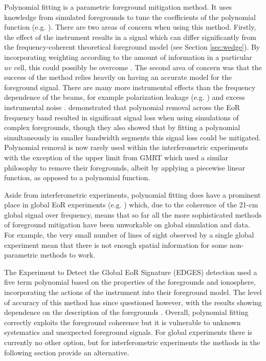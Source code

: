 Polynomial fitting is a parametric foreground mitigation method. It uses knowledge from simulated foregrounds to tune the coefficients of the polynomial function (e.g. \cite{jelic08}). There are two areas of concern when using this method. Firstly, the effect of the instrument results in a signal which can differ significantly from the frequency-coherent theoretical foreground model (see Section \ref{sec:wedge}). By incorporating weighting according to the amount of information in a particular $uv$ cell, this could possibly be overcome \cite{Liu2009MNRAS.398..401L,Bowman2009ApJ...695..183B}. The second area of concern was that the success of the method relies heavily on having an accurate model for the foreground signal. There are many more instrumental effects than the frequency dependence of the beams, for example polarization leakage (e.g. \cite{Nunhokee2017ApJ...848...47N,Asad2015MNRAS.451.3709A}) and excess instrumental noise \cite{Patil2016MNRAS.463.4317P}. \cite{Wang2013ApJ...763...90W} demonstrated that polynomial removal across the EoR frequency band resulted in significant signal loss when using simulations of complex foregrounds, though they also showed that by fitting a polynomial simultaneously in smaller bandwidth segments this signal loss could be mitigated. Polynomial removal is now rarely used within the interferometric experiments with the exception of the upper limit from GMRT \cite{Paciga2011MNRAS.413.1174P} which used a similar philosophy to remove their foregrounds, albeit by applying a piecewise linear function, as opposed to a polynomial function. 

Aside from interferometric experiments, polynomial fitting does have a prominent place in global EoR experiments (e.g. \cite{Singh2018ApJ...858...54S,Bowman2018Natur.555...67B}) which, due to the coherence of the 21-cm global signal over frequency, means that so far all the more sophisticated methods of foreground mitigation have been unworkable on global simulation and data. For example, the very small number of lines of sight observed by a single global experiment mean that there is not enough spatial information for some non-parametric methods to work.

The Experiment to Detect the Global EoR Signature (EDGES) detection \cite{Bowman2018Natur.555...67B} used a five term polynomial based on the properties of the foregrounds and ionosphere, incorporating the actions of the instrument into their foreground model. The level of accuracy of this method has since questioned however, with the results showing dependence on the description of the foregrounds \cite{Bradley2019ApJ...874..153B,Hills2018Natur.564E..32H}. Overall, polynomial fitting correctly exploits the foreground coherence but it is vulnerable to unknown systematics and unexpected foreground signals. For global experiments there is currently no other option, but for interferometric experiments the methods in the following section provide an alternative.

